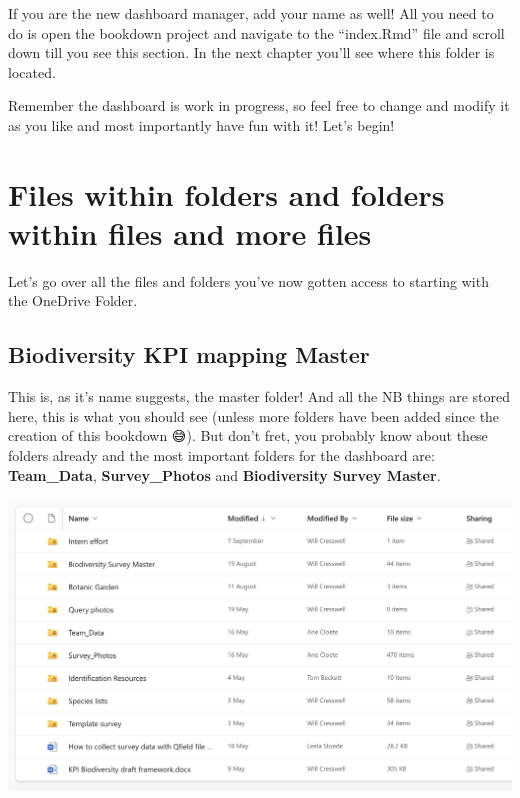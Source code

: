 \documentclass[
]{book}
\begin{document}
If you are the new dashboard manager, add your name as well! All you need to do is open the bookdown project and navigate to the ``index.Rmd'' file and scroll down till you see this section. In the next chapter you'll see where this folder is located.

Remember the dashboard is work in progress, so feel free to change and modify it as you like and most importantly have fun with it! Let's begin!

\hypertarget{files-within-folders-and-folders-within-files-and-more-files}{%
\chapter{Files within folders and folders within files and more files}\label{files-within-folders-and-folders-within-files-and-more-files}}

Let's go over all the files and folders you've now gotten access to starting with the OneDrive Folder.

\hypertarget{biodiversity-kpi-mapping-master}{%
\section{Biodiversity KPI mapping Master}\label{biodiversity-kpi-mapping-master}}

This is, as it's name suggests, the master folder! And all the NB things are stored here, this is what you should see (unless more folders have been added since the creation of this bookdown 😅). But don't fret, you probably know about these folders already and the most important folders for the dashboard are: \textbf{Team\_Data}, \textbf{Survey\_Photos} and \textbf{Biodiversity Survey Master}.

\includegraphics{images/KPI_contents.png}
\end{document}
